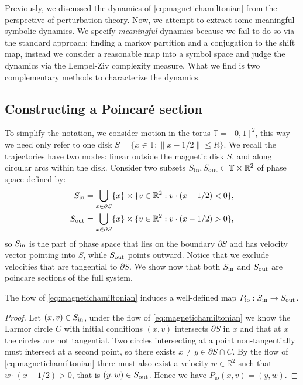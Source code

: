 
Previously, we discussed the dynamics of \eqref{eq:magnetichamiltonian} from the perspective of perturbation theory. Now, we attempt to extract some meaningful symbolic dynamics. We specify \textit{meaningful} dynamics because we fail to do so via the standard approach: finding a markov partition and a conjugation to the shift map, instead we consider a reasonable map into a symbol space and judge the dynamics via the Lempel-Ziv complexity measure. What we find is two complementary methods to characterize the dynamics.

\subsection{Constructing a Poincar\'e section}

To simplify the notation, we consider motion in the torus $\mathbb T=[0,1]^2$, this way we need only refer to one disk $S= \{x\in \mathbb T : \|x-1/2\|\le R\}$. We recall the trajectories have two modes: linear outside the magnetic disk $S$, and along circular arcs within the disk. Consider two subsets $S_\text{in},S_\text{out}\subset \mathbb T\times\mathbb R^2$ of phase space defined by:
\begin{align}
\label{def:poincaresectionIN}
S_\text{in} &= \bigcup_{x\in\partial S} \{x\} \times \{v\in\mathbb R^2 : v\cdot (x-1/2) < 0\},\\
\label{def:poincaresectionOUT}
S_\text{out} &= \bigcup_{x\in\partial S} \{x\} \times \{v\in\mathbb R^2 : v\cdot (x-1/2) > 0\},
\end{align}
so $S_\text{in}$ is the part of phase space that lies on the boundary $\partial S$ and has velocity vector pointing into $S$, while $S_\text{out}$ points outward. Notice that we exclude velocities that are tangential to $\partial S$. We show now that both $S_\text{in}$ and $S_\text{out}$ are poincare sections of the full system.

\begin{lemma}
The flow of \eqref{eq:magnetichamiltonian} induces a well-defined map $P_\text{io}:S_\text{in}\to S_\text{out}$.
\end{lemma}
\begin{proof}
Let $(x,v)\in S_\text{in}$, under the flow of \eqref{eq:magnetichamiltonian} we know the Larmor circle $C$ with initial conditions $(x,v)$ intersects $\partial S$ in $x$ and that at $x$ the circles are not tangential. Two circles intersecting at a point non-tangentially must intersect at a second point, so there exists $x\neq y\in\partial S\cap C$. By the flow of \eqref{eq:magnetichamiltonian} there must also exist a velocity $w\in\mathbb R^2$ such that $w\cdot(x-1/2)>0$, that is $(y,w)\in S_\text{out}$. Hence we have $P_\text{io}(x,v) = (y,w)$. 
\end{proof}

